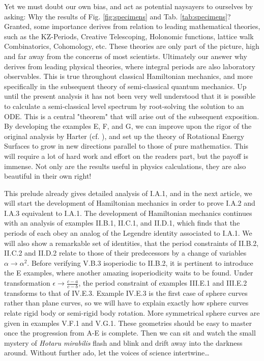 \documentclass[nofootinbib,preprint]{revtex4-1}
\begin{document}
Yet we must doubt our own bias, and act as potential naysayers to ourselves by 
asking: Why the results of Fig. \ref{fig:specimens} and Tab. \ref{tab:specimens}? Granted, some 
importance derives from relation to leading mathematical theories, such as the KZ-Periods, Creative 
Telescoping, Holonomic functions, lattice walk Combinatorics, Cohomology, etc. These theories are 
only part of the picture, high and far away from the concerns of most scientists. Ultimately our answer why 
derives from leading physical theories, where integral periods are also laboratory observables. 
This is true throughout classical Hamiltonian mechanics, and more specifically in the subsequent theory
of semi-classical quantum mechanics. Up until the present analysis it has not been very well
understood that it is possible to calculate a semi-classical level spectrum by root-solving the
solution to an ODE. This is a central "theorem" that will arise out of the subsequent exposition. 
By developing the examples E, F, and G, we can improve upon the rigor of the original analysis 
by Harter (cf. \cite{HP1984,HW1989,HARTER2006}), and set up the theory of Rotational Energy 
Surfaces to grow in new directions parallel to those of pure mathematics. This will require 
a lot of hard work and effort on the readers part, but the payoff is immense. Not only 
are the results useful in physics calculations, they are also beautiful in their own right!

This prelude already gives detailed analysis of I.A.1, and in the next article, we will start 
the development of Hamiltonian mechanics in order to prove I.A.2 and I.A.3 equivalent to I.A.1. 
The development of Hamiltonian mechanics continues with an analysis of examples II.B.1, II.C.1, 
and II.D.1, which finds that the periods of each obey an analog of the Legendre identity associated
to I.A.1. We will also show a remarkable set of identities, that the period constraints of II.B.2, 
II.C.2 and II.D.2 relate to those of their predecessors by a change of variables 
$\alpha \rightarrow \alpha^2$. Before verifying V.B.3 isoperiodic to II.B.2, it is pertinent to
introduce the E examples, where another amazing isoperiodicity waits to be found. Under transformation 
$\epsilon \rightarrow \frac{c-a}{c-b}$, the period constraint of examples III.E.1 and III.E.2 transforms 
to that of IV.E.3. Example IV.E.3 is the first case of sphere curves rather than plane curves, so 
we will have to explain exactly how sphere curves relate rigid body or semi-rigid body rotation. More 
symmetrical sphere curves are given in examples V.F.1 and V.G.1. These geometries should 
be easy to master once the progression from A-E is complete. Then we can sit and watch the small 
mystery of \textit{Hotaru mirabilis} flash and blink and drift away into the darkness around.
Without further ado, let the voices of science intertwine\ldots

\pagebreak  
 


\end{document}

